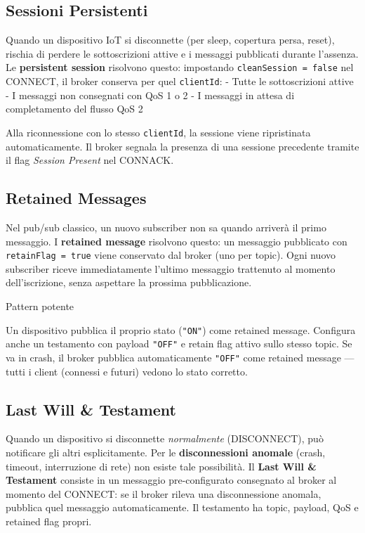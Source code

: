 \documentclass[
  italian,
  openany]{book}
\begin{document}
\subsection{Sessioni Persistenti}\label{sessioni-persistenti-1}

Quando un dispositivo IoT si disconnette (per sleep, copertura persa,
reset), rischia di perdere le sottoscrizioni attive e i messaggi
pubblicati durante l'assenza. Le \textbf{persistent session} risolvono
questo: impostando \texttt{cleanSession\ =\ false} nel CONNECT, il
broker conserva per quel \texttt{clientId}: - Tutte le sottoscrizioni
attive - I messaggi non consegnati con QoS 1 o 2 - I messaggi in attesa
di completamento del flusso QoS 2

Alla riconnessione con lo stesso \texttt{clientId}, la sessione viene
ripristinata automaticamente. Il broker segnala la presenza di una
sessione precedente tramite il flag \emph{Session Present} nel CONNACK.

\subsection{Retained Messages}\label{retained-messages}

Nel pub/sub classico, un nuovo subscriber non sa quando arriverà il
primo messaggio. I \textbf{retained message} risolvono questo: un
messaggio pubblicato con \texttt{retainFlag\ =\ true} viene conservato
dal broker (uno per topic). Ogni nuovo subscriber riceve immediatamente
l'ultimo messaggio trattenuto al momento dell'iscrizione, senza
aspettare la prossima pubblicazione.

\begin{callouttip}{Pattern potente}

Un dispositivo pubblica il proprio stato (\texttt{"ON"}) come retained
message. Configura anche un testamento con payload \texttt{"OFF"} e
retain flag attivo sullo stesso topic. Se va in crash, il broker
pubblica automaticamente \texttt{"OFF"} come retained message --- tutti
i client (connessi e futuri) vedono lo stato corretto.

\end{callouttip}

\subsection{Last Will \& Testament}\label{last-will-testament}

Quando un dispositivo si disconnette \emph{normalmente} (DISCONNECT),
può notificare gli altri esplicitamente. Per le \textbf{disconnessioni
anomale} (crash, timeout, interruzione di rete) non esiste tale
possibilità. Il \textbf{Last Will \& Testament} consiste in un messaggio
pre-configurato consegnato al broker al momento del CONNECT: se il
broker rileva una disconnessione anomala, pubblica quel messaggio
automaticamente. Il testamento ha topic, payload, QoS e retained flag
propri.
\end{document}
